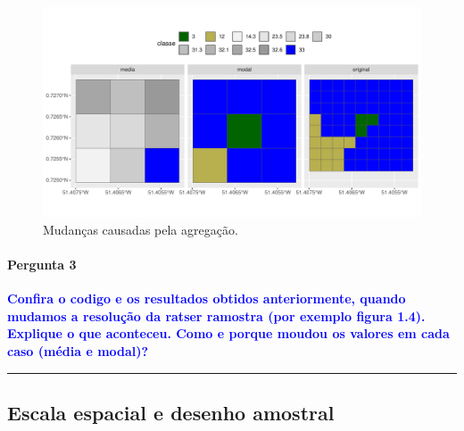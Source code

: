 \documentclass[
]{article}
\begin{document}
\begin{figure}
\centering
\includegraphics{epr_files/figure-latex/fig-mud-agg-1.pdf}
\caption{\label{fig:fig-mud-agg}Mudanças causadas pela agregação.}
\end{figure}

\hypertarget{pergunta-3}{%
\paragraph{Pergunta 3}\label{pergunta-3}}

\textcolor{blue}{\textbf{Confira o codigo e os resultados obtidos anteriormente, quando mudamos a resolução da ratser ramostra (por exemplo figura 1.4). Explique o que aconteceu. Como e porque moudou os valores em cada caso (média e modal)?}}

\begin{center}\rule{0.5\linewidth}{0.5pt}\end{center}

\newpage

\hypertarget{escala-espacial-e-desenho-amostral}{%
\subsection{Escala espacial e desenho amostral}\label{escala-espacial-e-desenho-amostral}}
\end{document}
